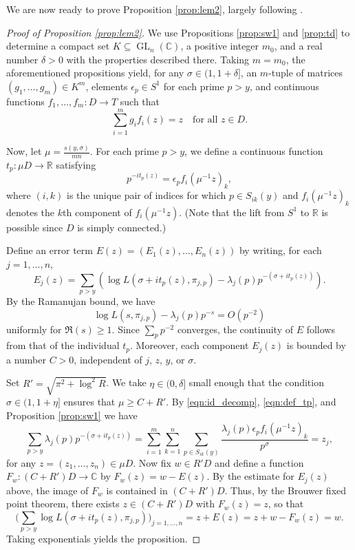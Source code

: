 \documentclass[11pt]{amsart}
\theoremstyle{remark}
\numberwithin{theorem}{section}
\numberwithin{equation}{section}
\newcommand{\R}{\mathbb{R}}
\newcommand{\C}{\mathbb{C}}
\DeclareMathOperator{\GL}{GL}
\begin{document}
We are now ready to prove Proposition \ref{prop:lem2}, largely following \cite{SW}.

\begin{proof}[Proof of Proposition \ref{prop:lem2}]
We use Propositions \ref{prop:sw1} and \ref{prop:td} to 
determine a compact set $K\subseteq\GL_n(\C)$, a positive integer
$m_0$, and a real number $\delta>0$ with the properties described
there. 
Taking $m=m_0$,
the aforementioned propositions yield, for any
$\sigma\in(1,1+\delta]$, an $m$-tuple of matrices
$(g_1,\ldots,g_m)\in K^m$, elements $\epsilon_p \in S^1$ for each prime $p > y$, and
continuous functions $f_1,\dots,f_m:D\rightarrow T$
such that
\begin{equation}\label{eqn:id_decomp}
\sum_{i=1}^m g_i f_i(z) = z\quad\text{for all }z\in D.
\end{equation}

Now, let $\mu=\frac{s(y,\sigma)}{mn}$.
For each prime $p>y$, we define
a continuous function $t_p : \mu D\rightarrow\R$ satisfying
\begin{equation}\label{eqn:def_tp}
p^{- i t_p(z)} = \epsilon_p f_i(\mu^{-1}z)_k,
\end{equation}
where $(i,k)$ is the unique pair of indices for which $p\in S_{ik}(y)$ and
$f_i(\mu^{-1}z)_k$ denotes the $k$th component of
$f_i(\mu^{-1}z)$.
(Note that the lift from $S^1$ to $\R$ is
possible since $D$ is simply connected.)

Define an error term $E(z)=(E_1(z),\ldots,E_n(z))$ by writing,
for each $j=1,\ldots,n$, 
$$
E_j(z)=\sum_{p>y}\left(\log L(\sigma+it_p(z),\pi_{j,p}) 
-\lambda_j(p)p^{-(\sigma+it_p(z))}\right).
$$
By the Ramanujan bound, we have
$$
\log L(s,\pi_{j,p})-\lambda_j(p)p^{-s}=O(p^{-2})
$$
uniformly for $\Re(s)\ge1$. Since $\sum_p p^{-2}$ converges,
the continuity of $E$ follows from that of the individual $t_p$.
Moreover, each component $E_j(z)$ is bounded by a number $C>0$, independent
of $j$, $z$, $y$, or $\sigma$. 

Set $R'=\sqrt{\pi^2+\log^2{R}}$.  We take $\eta\in(0,\delta]$
small enough that the condition $\sigma\in(1,1+\eta]$ ensures that
$\mu\ge C+R'$.
By \eqref{eqn:id_decomp}, \eqref{eqn:def_tp}, and
Proposition \ref{prop:sw1} we have
$$
\sum_{p>y}\lambda_j(p)p^{-(\sigma+it_p(z))}=
\sum_{i=1}^m\sum_{k=1}^n
\sum_{p\in S_{ik}(y)} 
\frac{\lambda_j(p)\epsilon_pf_i(\mu^{-1}z)_k}{p^{\sigma}}=z_j,
$$
for any $z=(z_1,\ldots,z_n)\in\mu{D}$.
Now fix $w\in R'D$ and define a function
$F_w:(C+R')D\to\C$ by $F_w(z)=w-E(z)$.
By the estimate for $E_j(z)$ above, the image of $F_w$ is contained
in $(C+R')D$. Thus,
by the Brouwer fixed point theorem, there exists $z\in(C+R')D$
with $F_w(z)=z$, so that
\[
\biggl(\sum_{p>y}\log L(\sigma+it_p(z),\pi_{j,p})\biggr)_{j=1,\ldots,n}
=z+E(z)=z+w-F_w(z)=w.
\]
Taking exponentials yields the proposition.
\end{proof}
\end{document}
